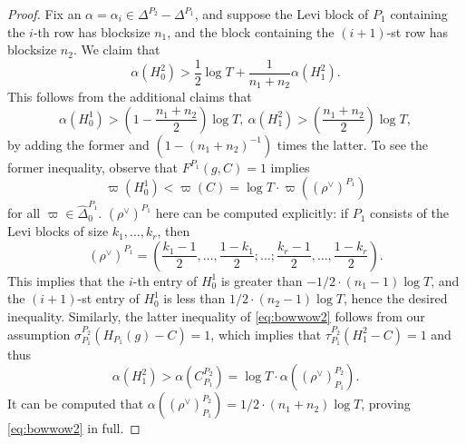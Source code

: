 \documentclass[11pt]{amsart}
\numberwithin{theorem}{section}
\numberwithin{equation}{section}
\theoremstyle{remark}
\theoremstyle{definition}
\begin{document}
\begin{proof}
Fix an $\alpha = \alpha_i \in \Delta^{P_2}-\Delta^{P_1}$, and suppose the Levi block of $P_1$ containing the $i$-th row has blocksize $n_1$, and the block containing the $(i+1)$-st row has blocksize $n_2$. We claim that
\begin{equation}\label{eq:bowwow}
\alpha(H_0^2) > \frac{1}{2}\log T + \frac{1}{n_1+n_2}\alpha(H_1^2).
\end{equation}
This follows from the additional claims that
\begin{equation} \label{eq:bowwow2}
\alpha(H_0^1) > \left(1-\frac{n_1+n_2}{2}\right)\log T, \ \alpha(H_1^2) > \left(\frac{n_1+n_2}{2}\right)\log T,
\end{equation}
by adding the former and $(1-(n_1+n_2)^{-1})$ times the latter.
To see the former inequality, observe that $F^{P_1}(g,C) = 1$ implies
\begin{equation*}
\varpi(H_0^1) < \varpi(C) = \log T \cdot \varpi((\rho^\vee)^{P_1})
\end{equation*}
for all $\varpi \in \widehat\Delta_0^{P_1}$. $(\rho^\vee)^{P_1}$ here can be computed explicitly: if $P_1$ consists of the Levi blocks of size $k_1,\ldots,k_r$, then
\begin{equation*}
(\rho^\vee)^{P_1} = \left(\frac{k_1-1}{2}, \ldots, \frac{1-k_1}{2}; \ldots ; \frac{k_r-1}{2}, \ldots, \frac{1-k_r}{2} \right).
\end{equation*}
This implies that the $i$-th entry of $H_0^1$ is greater than $-1/2 \cdot (n_1-1)\log T$, and the $(i+1)$-st entry of $H_0^1$ is less than $1/2 \cdot (n_2-1)\log T$, hence the desired inequality. Similarly, the latter inequality of \eqref{eq:bowwow2} follows from our assumption $\sigma_{P_1}^{P_2}(H_{P_1}(g) - C) = 1$, which implies that $\tau_{P_1}^{P_2}(H_1^2 - C) = 1$ and thus
\begin{equation*}
\alpha(H_1^2) > \alpha(C_{P_1}^{P_2}) = \log T \cdot \alpha((\rho^\vee)_{P_1}^{P_2}).
\end{equation*}
It can be computed that $\alpha((\rho^\vee)_{P_1}^{P_2}) = 1/2 \cdot (n_1 + n_2)\log T$, proving \eqref{eq:bowwow2} in full.


\end{proof}
\end{document}
